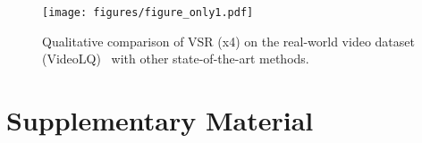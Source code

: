 \documentclass[sigconf, nonacm]{acmart}
\begin{document}
\begin{figure*}[t]
    \centering
    \texttt{[image: figures/figure\_only1.pdf]}
    \caption{Qualitative comparison of VSR (x4) on the real-world video dataset (VideoLQ)~\cite{chan2022investigating} with other state-of-the-art methods.}
    \label{fig:fo1}
\end{figure*}

\clearpage
\twocolumn

\appendix
\section*{Supplementary Material}


\end{document}
